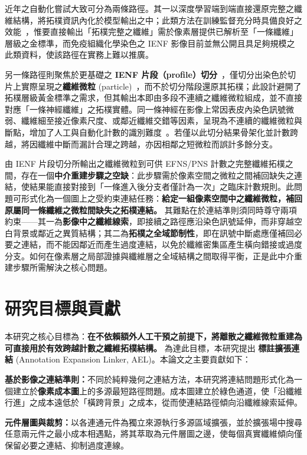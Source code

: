 近年之自動化嘗試大致可分為兩條路徑。其一以深度學習端到端直接還原完整之纖維結構，將拓樸資訊內化於模型輸出之中；此類方法在訓練監督充分時具備良好之效能~\cite{chan2022automated, zhang2020automatic}，惟要直接輸出「拓樸完整之纖維」需於像素層提供已解析至「一條纖維」層級之金標準，而免疫組織化學染色之 IENF 影像目前並無公開且具足夠規模之此類資料，使該路徑在實務上難以推廣。

另一條路徑則聚焦於更基礎之 \textbf{IENF 片段（profile）切分}~\cite{huang2026automated}，僅切分出染色於切片上實際呈現之\textbf{纖維微粒} (particle)~\cite{hsueh2026machine}，而不於切分階段還原其拓樸；此設計避開了拓樸層級黃金標準之需求，但其輸出本即由多段不連續之纖維微粒組成，並不直接對應「一條神經纖維」之拓樸實體。同一條神經在影像上常因表皮內染色訊號微弱、纖維細至接近像素尺度、或鄰近纖維交錯等因素，呈現為不連續的纖維微粒與斷點，增加了人工與自動化計數的識別難度~\cite{corra2021advantages}。若僅以此切分結果骨架化並計數跨越，將因纖維中斷而漏計合理之跨越，亦因相鄰之短微粒而誤計多餘分支。

由 IENF 片段切分所輸出之纖維微粒到可供 EFNS/PNS 計數之完整纖維拓樸之間，存在一個\textbf{中介重建步驟之空缺}：此步驟需於像素空間之微粒之間補回缺失之連結，使結果能直接對接到「一條進入後分支者僅計為一次」之臨床計數規則。此問題可形式化為一個圖上之受約束連結任務：\textbf{給定一組像素空間中之纖維微粒，補回原屬同一條纖維之微粒間缺失之拓樸連結。} 其難點在於連結準則須同時尊守兩項約束——其一為\textbf{影像中之纖維線索}，即接續之路徑應沿染色訊號延伸，而非穿越空白背景或鄰近之異質結構；其二為\textbf{拓樸之全域節制性}，即在訊號中斷處應僅補回必要之連結，而不能因鄰近而產生過度連結，以免於纖維密集區產生橫向錯接或過度分支。如何在像素層之局部證據與纖維層之全域結構之間取得平衡，正是此中介重建步驟所需解決之核心問題。

\section{研究目標與貢獻}
\label{sec:contributions}

本研究之核心目標為：\textbf{在不依賴額外人工干預之前提下，將離散之纖維微粒重建為可直接用於有效跨越計數之纖維拓樸結構。} 為達此目標，本研究提出 \textbf{標註擴張連結} (Annotation Expansion Linker, AEL)。本論文之主要貢獻如下：

\textbf{基於影像之連結準則：}不同於純粹幾何之連結方法，本研究將連結問題形式化為一個建立於\textbf{像素成本圖}上的多源最短路徑問題。成本圖建立於綠色通道，使「沿纖維行進」之成本遠低於「橫跨背景」之成本，從而使連結路徑傾向沿纖維線索延伸。

\textbf{元件層圖與裁剪：}以各連通元件為獨立來源執行多源區域擴張，並於擴張場中搜尋任意兩元件之最小成本相遇點，將其萃取為元件層圖之邊，使每個真實纖維傾向僅保留必要之連結、抑制過度連線。

